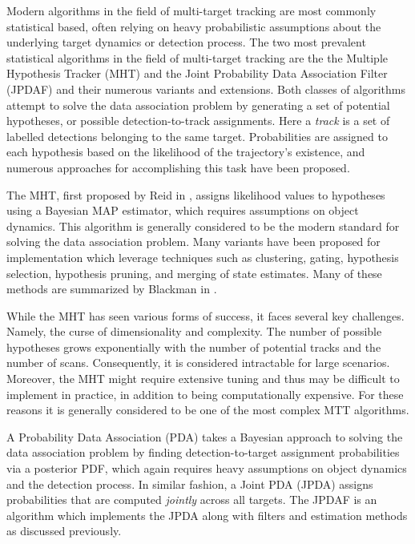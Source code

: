 \documentclass[journal]{IEEEtran}
\begin{document}
Modern algorithms in the field of multi-target tracking are most commonly statistical based, often relying on heavy probabilistic assumptions about the underlying target dynamics or detection process. The two most prevalent statistical algorithms in the field of multi-target tracking are the the Multiple Hypothesis Tracker (MHT) and the Joint Probability Data Association Filter (JPDAF) and their numerous variants and extensions. Both classes of algorithms attempt to solve the data association problem by generating a set of potential hypotheses, or possible detection-to-track assignments. Here a \textit{track} is a set of labelled detections belonging to the same target. Probabilities are assigned to each hypothesis based on the likelihood of the trajectory's existence, and numerous approaches for accomplishing this task have been proposed.

The MHT, first proposed by Reid in \cite{MHT-Seminal}, assigns likelihood values to hypotheses using a Bayesian MAP estimator, which requires assumptions on object dynamics. This algorithm is generally considered to be the modern standard for solving the data association problem. Many variants have been proposed for implementation which leverage techniques such as clustering, gating, hypothesis selection, hypothesis pruning, and merging of state estimates. Many of these methods are summarized by Blackman in \cite{MHT-Overview}. 

While the MHT has seen various forms of success, it faces several key challenges. Namely, the curse of dimensionality and complexity. The number of possible hypotheses grows exponentially with the number of potential tracks and the number of scans. Consequently, it is considered intractable for large scenarios. Moreover, the MHT might require extensive tuning and thus may be difficult to implement in practice, in addition to being computationally expensive. For these reasons it is generally considered to be one of the most complex MTT algorithms. 

A Probability Data Association (PDA) takes a Bayesian approach to solving the data association problem by finding detection-to-target assignment probabilities via a posterior PDF, which again requires heavy assumptions on object dynamics and the detection process. In similar fashion, a Joint PDA (JPDA) assigns probabilities that are computed \textit{jointly} across all targets. The JPDAF is an algorithm which implements the JPDA along with filters and estimation methods as discussed previously. \cite{Bar-Shalom_MTT} 
\end{document}

